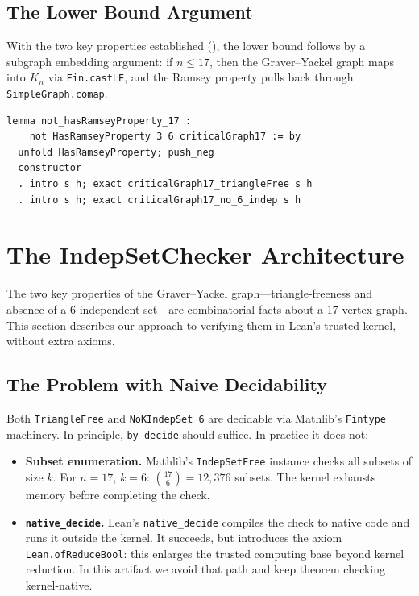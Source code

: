 \documentclass[11pt]{article}
\newcommand{\lean}[1]{\texttt{#1}}
\begin{document}
\subsection{The Lower Bound Argument}

With the two key properties established (), the lower bound
follows by a subgraph embedding argument: if $n \leq 17$, then the
Graver--Yackel graph maps into $K_n$ via \lean{Fin.castLE}, and the Ramsey
property pulls back through \lean{SimpleGraph.comap}.

\begin{lstlisting}
lemma not_hasRamseyProperty_17 :
    not HasRamseyProperty 3 6 criticalGraph17 := by
  unfold HasRamseyProperty; push_neg
  constructor
  . intro s h; exact criticalGraph17_triangleFree s h
  . intro s h; exact criticalGraph17_no_6_indep s h
\end{lstlisting}

\section{The IndepSetChecker Architecture}
\label{sec:checker}

The two key properties of the Graver--Yackel graph---triangle-freeness and
absence of a 6-independent set---are combinatorial facts about a 17-vertex graph.
This section describes our approach to verifying them in Lean's trusted kernel,
without extra axioms.

\subsection{The Problem with Naive Decidability}
\label{sec:checker:problem}

Both \lean{TriangleFree} and \lean{NoKIndepSet 6} are decidable via
Mathlib's \lean{Fintype} machinery.
In principle, \lean{by decide} should suffice.
In practice it does not:

\begin{itemize}
\item \textbf{Subset enumeration.}
  Mathlib's \lean{IndepSetFree} instance checks all subsets of size $k$.
  For $n = 17$, $k = 6$: $\binom{17}{6} = 12{,}376$ subsets.
  The kernel exhausts memory before completing the check.

\item \textbf{\lean{native\_decide}.}
  Lean's \lean{native\_decide} compiles the check to native code and runs it
  outside the kernel.
  It succeeds, but introduces the axiom \lean{Lean.ofReduceBool}:
  this enlarges the trusted computing base beyond kernel reduction.
  In this artifact we avoid that path and keep theorem checking kernel-native.
\end{itemize}
\end{document}
